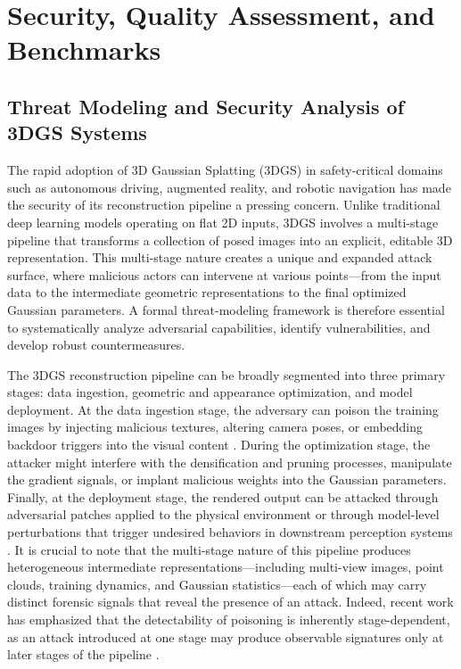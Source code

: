 \documentclass[11pt]{article}
\begin{document}
\section{Security, Quality Assessment, and Benchmarks}

\subsection{Threat Modeling and Security Analysis of 3DGS Systems}

The rapid adoption of 3D Gaussian Splatting (3DGS) in safety-critical domains such as autonomous driving, augmented reality, and robotic navigation has made the security of its reconstruction pipeline a pressing concern. Unlike traditional deep learning models operating on flat 2D inputs, 3DGS involves a multi-stage pipeline that transforms a collection of posed images into an explicit, editable 3D representation. This multi-stage nature creates a unique and expanded attack surface, where malicious actors can intervene at various points---from the input data to the intermediate geometric representations to the final optimized Gaussian parameters. A formal threat-modeling framework is therefore essential to systematically analyze adversarial capabilities, identify vulnerabilities, and develop robust countermeasures.

The 3DGS reconstruction pipeline can be broadly segmented into three primary stages: data ingestion, geometric and appearance optimization, and model deployment. At the data ingestion stage, the adversary can poison the training images by injecting malicious textures, altering camera poses, or embedding backdoor triggers into the visual content \cite{ref710}. During the optimization stage, the attacker might interfere with the densification and pruning processes, manipulate the gradient signals, or implant malicious weights into the Gaussian parameters. Finally, at the deployment stage, the rendered output can be attacked through adversarial patches applied to the physical environment or through model-level perturbations that trigger undesired behaviors in downstream perception systems \cite{ref711}. It is crucial to note that the multi-stage nature of this pipeline produces heterogeneous intermediate representations---including multi-view images, point clouds, training dynamics, and Gaussian statistics---each of which may carry distinct forensic signals that reveal the presence of an attack. Indeed, recent work has emphasized that the detectability of poisoning is inherently stage-dependent, as an attack introduced at one stage may produce observable signatures only at later stages of the pipeline \cite{ref712}.
\end{document}
